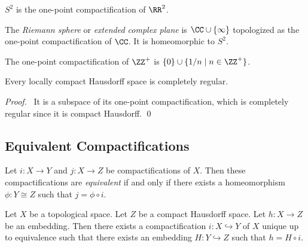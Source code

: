 \begin{example}
    $S^2$ is the one-point compactification of $\RR^2$.
\end{example}

\begin{definition}
    The \emph{Riemann sphere} or \emph{extended complex plane} is $\CC \cup \{ \infty \}$
    topologized as the one-point compactification of $\CC$. It is homeomorphic to $S^2$.
\end{definition}

\begin{example}
    The one-point compactification of $\ZZ^+$ is $\{0\} \cup \{ 1/n \mid n \in \ZZ^+ \}$.
\end{example}

\begin{proposition}
    Every locally compact Hausdorff space is completely regular.
\end{proposition}

\begin{proof}
    \pf\ It is a subspace of its one-point compactification, which is completely regular since
    it is compact Hausdorff. \qed
\end{proof}

\subsection{Equivalent Compactifications}

\begin{definition}
    Let $i : X \rightarrow Y$ and $j : X \rightarrow Z$ be compactifications of $X$. Then these compactifications
    are \emph{equivalent} if and only if there exists a homeomorphism $\phi : Y \cong Z$ such that $j = \phi \circ i$.
\end{definition}

\begin{lemma}
    Let $X$ be a topological space. Let $Z$ be a compact Hausdorff space. Let $h : X \rightarrow Z$ be an embedding.
    Then there exists a compactification $i : X \hookrightarrow Y$ of $X$ unique up to equivalence such that there
    exists an embedding $H : Y \hookrightarrow Z$ such that $h = H \circ i$.
\end{lemma}

